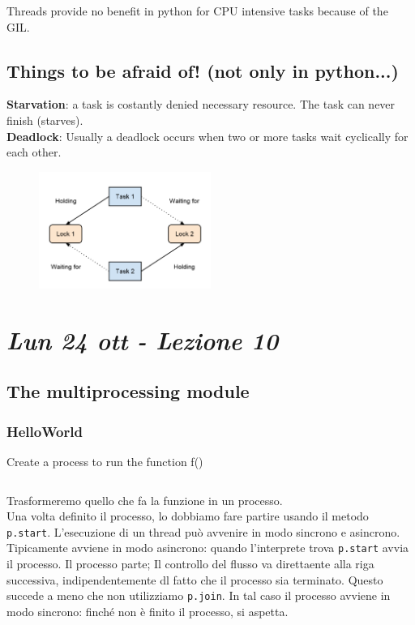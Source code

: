 Threads provide no benefit in python for CPU intensive tasks because of the GIL.

\subsection{Things to be afraid of! (not only in python...)}

\textbf{Starvation}: a task is costantly denied necessary resource. The task can never finish (starves).\\
\textbf{Deadlock}: Usually a deadlock occurs when two or more tasks wait cyclically for each other.


\begin{figure}[ht]
    \centering
    \includegraphics[width=0.5\textwidth]{figure_parallel/deadlock.png}\end{figure}
\FloatBarrier

\newpage
\section{\textit{Lun 24 ott - Lezione 10}}

\subsection{The multiprocessing module}
\subsubsection{HelloWorld}
Create a process
to run the function
f()

\inputminted{python}{python_parallel/HelloWorld.py}



Trasformeremo quello che fa la funzione in un processo.\\
Una volta definito il processo, lo dobbiamo fare partire usando il metodo \texttt{p.start}.
L'esecuzione di un thread può avvenire in modo sincrono e asincrono. Tipicamente avviene in modo asincrono: quando l'interprete trova \texttt{p.start} avvia il processo. Il processo parte; Il controllo del flusso va direttaente alla riga successiva, indipendentemente dl fatto che il processo sia terminato.
Questo succede a meno che non utilizziamo \texttt{p.join}. In tal caso il processo avviene in modo sincrono: finché non è finito il processo, si aspetta.

